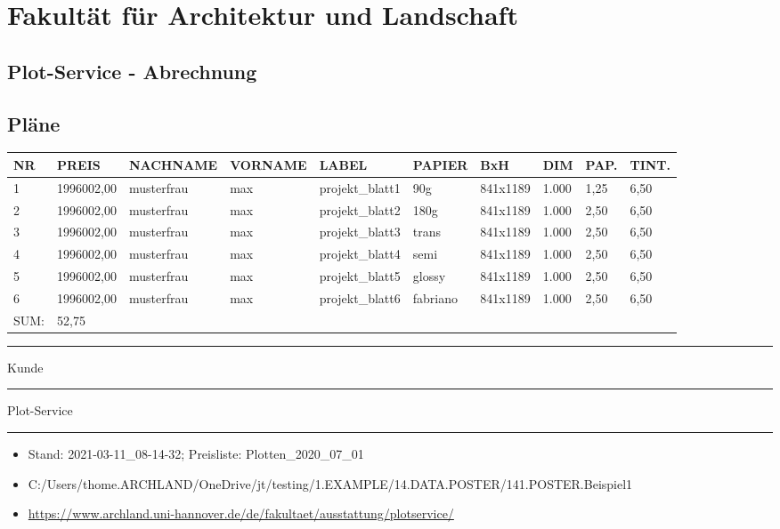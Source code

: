 \documentclass[
]{article}
\author{}
\date{}
\begin{document}
\hypertarget{fakultuxe4t-fuxfcr-architektur-und-landschaft}{%
\section{Fakultät für Architektur und
Landschaft}\label{fakultuxe4t-fuxfcr-architektur-und-landschaft}}

\hypertarget{plot-service---abrechnung}{%
\subsection{Plot-Service - Abrechnung}\label{plot-service---abrechnung}}

\hypertarget{pluxe4ne}{%
\subsection{Pläne}\label{pluxe4ne}}

\begin{longtable}[]{@{}llllllllll@{}}
\toprule
NR & PREIS & NACHNAME & VORNAME & LABEL & PAPIER & BxH & DIM & PAP. &
TINT. \\
\midrule
\endhead
1 & 1996002,00 & musterfrau & max & projekt\_blatt1 & 90g & 841x1189 &
1.000 & 1,25 & 6,50 \\
2 & 1996002,00 & musterfrau & max & projekt\_blatt2 & 180g & 841x1189 &
1.000 & 2,50 & 6,50 \\
3 & 1996002,00 & musterfrau & max & projekt\_blatt3 & trans & 841x1189 &
1.000 & 2,50 & 6,50 \\
4 & 1996002,00 & musterfrau & max & projekt\_blatt4 & semi & 841x1189 &
1.000 & 2,50 & 6,50 \\
5 & 1996002,00 & musterfrau & max & projekt\_blatt5 & glossy & 841x1189
& 1.000 & 2,50 & 6,50 \\
6 & 1996002,00 & musterfrau & max & projekt\_blatt6 & fabriano &
841x1189 & 1.000 & 2,50 & 6,50 \\
SUM: & 52,75 & & & & & & & & \\
\bottomrule
\end{longtable}

\begin{center}\rule{0.5\linewidth}{0.5pt}\end{center}

Kunde

\begin{center}\rule{0.5\linewidth}{0.5pt}\end{center}

Plot-Service

\begin{center}\rule{0.5\linewidth}{0.5pt}\end{center}

\begin{itemize}
\item
  Stand: 2021-03-11\_08-14-32; Preisliste: Plotten\_2020\_07\_01
\item
  C:/Users/thome.ARCHLAND/OneDrive/jt/testing/1.EXAMPLE/14.DATA.POSTER/141.POSTER.Beispiel1
\item
  \url{https://www.archland.uni-hannover.de/de/fakultaet/ausstattung/plotservice/}
\end{itemize}
\end{document}
